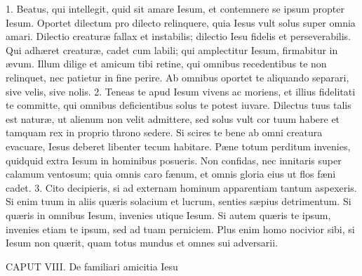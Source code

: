 1. Beatus, qui intellegit, quid sit amare Iesum, et contemnere se ipsum propter Iesum. Oportet dilectum pro dilecto relinquere, quia Iesus vult solus super omnia amari. Dilectio creaturæ fallax et instabilis; dilectio Iesu fidelis et perseverabilis. Qui adhæret creaturæ, cadet cum labili; qui amplectitur Iesum, firmabitur in ævum. Illum dilige et amicum tibi retine, qui omnibus recedentibus te non relinquet, nec patietur in fine perire. Ab omnibus oportet te aliquando separari, sive velis, sive nolis.
2. Teneas te apud Iesum vivens ac moriens, et illius fidelitati te committe, qui omnibus deficientibus solus te potest iuvare. Dilectus tuus talis est naturæ, ut alienum non velit admittere, sed solus vult cor tuum habere et tamquam rex in proprio throno sedere. Si scires te bene ab omni creatura evacuare, Iesus deberet libenter tecum habitare. Pæne totum perditum invenies, quidquid extra Iesum in hominibus posueris. Non confidas, nec innitaris super calamum ventosum; quia omnis caro fænum, et omnis gloria eius ut flos fæni cadet.
3. Cito decipieris, si ad externam hominum apparentiam tantum aspexeris. Si enim tuum in aliis quæris solacium et lucrum, senties sæpius detrimentum. Si quæris in omnibus Iesum, invenies utique Iesum. Si autem quæris te ipsum, invenies etiam te ipsum, sed ad tuam perniciem. Plus enim homo nocivior sibi, si Iesum non quærit, quam totus mundus et omnes sui adversarii.


CAPUT VIII.
De familiari amicitia Iesu

